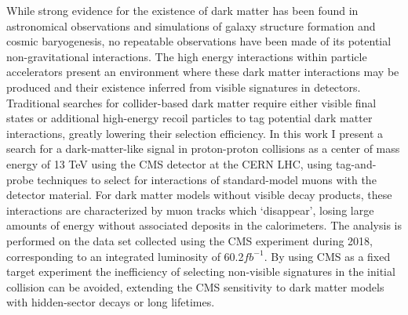 While strong evidence for the existence of dark matter has been found in astronomical observations and simulations of galaxy structure formation and cosmic baryogenesis, no repeatable observations have been made of its potential non-gravitational interactions. 
The high energy interactions within particle accelerators present an environment where these dark matter interactions may be produced and their existence inferred from visible signatures in detectors. 
Traditional searches for collider-based dark matter require either visible final states or additional high-energy recoil particles to tag potential dark matter interactions, greatly lowering their selection efficiency. 
In this work I present a search for a dark-matter-like signal in proton-proton collisions as a center of mass energy of 13 TeV using the CMS detector at the CERN LHC, using tag-and-probe techniques to select for interactions of standard-model muons with the detector material.
For dark matter models without visible decay products, these interactions are characterized by muon tracks which `disappear', losing large amounts of energy without associated deposits in the calorimeters.
The analysis is performed on the data set collected using the CMS experiment during 2018, corresponding to an integrated luminosity of 60.2$fb^{-1}$.
By using CMS as a fixed target experiment the inefficiency of selecting non-visible signatures in the initial collision can be avoided, extending the CMS sensitivity to dark matter models with hidden-sector decays or long lifetimes.

